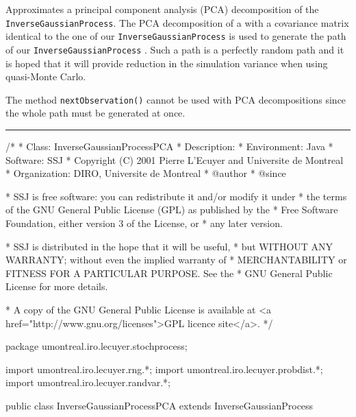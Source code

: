 
Approximates a principal component analysis (PCA)
decomposition of the \texttt{InverseGaussianProcess}.
The PCA decomposition of a 
with a covariance matrix identical to the one
of our \texttt{InverseGaussianProcess} is used to 
generate the path of our \texttt{InverseGaussianProcess}
\cite{fLEC08a}.  Such a path is a perfectly random path
and it is hoped that it will provide reduction
in the simulation variance when using quasi-Monte Carlo.

The method \texttt{nextObservation()} cannot be used with 
PCA decompositions since the whole path must be generated at
once. 


\bigskip\hrule\bigskip

\begin{code}
\begin{hide}
/*
 * Class:        InverseGaussianProcessPCA
 * Description:  
 * Environment:  Java
 * Software:     SSJ 
 * Copyright (C) 2001  Pierre L'Ecuyer and Universite de Montreal
 * Organization: DIRO, Universite de Montreal
 * @author       
 * @since

 * SSJ is free software: you can redistribute it and/or modify it under
 * the terms of the GNU General Public License (GPL) as published by the
 * Free Software Foundation, either version 3 of the License, or
 * any later version.

 * SSJ is distributed in the hope that it will be useful,
 * but WITHOUT ANY WARRANTY; without even the implied warranty of
 * MERCHANTABILITY or FITNESS FOR A PARTICULAR PURPOSE.  See the
 * GNU General Public License for more details.

 * A copy of the GNU General Public License is available at
   <a href="http://www.gnu.org/licenses">GPL licence site</a>.
 */
\end{hide}
package umontreal.iro.lecuyer.stochprocess;\begin{hide}
import umontreal.iro.lecuyer.rng.*;
import umontreal.iro.lecuyer.probdist.*;
import umontreal.iro.lecuyer.randvar.*;

\end{hide}

public class InverseGaussianProcessPCA extends InverseGaussianProcess \begin{hide} {

    protected BrownianMotionPCA bmPCA;
\end{hide}
\end{code}

